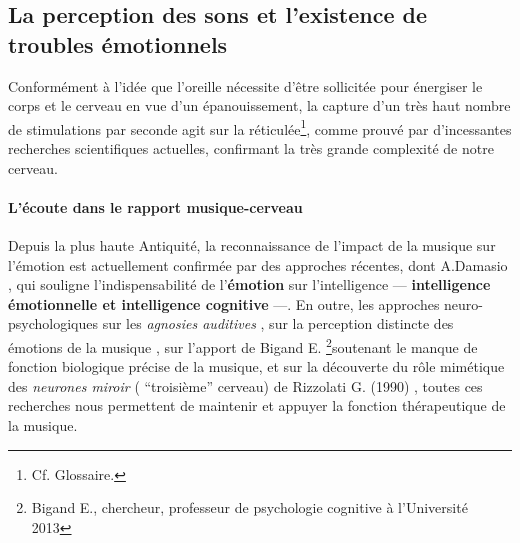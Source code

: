 \subsection{La perception des sons et l'existence de troubles
  émotionnels}


Conformément à l'idée que l'oreille nécessite d'être sollicitée pour
énergiser le corps et le cerveau en vue d'un épanouissement, la
capture d'un très haut nombre de stimulations par seconde agit
sur la \gls{réticulée}\footnote {Cf. Glossaire.},
comme prouvé par d'incessantes recherches scientifiques actuelles,
confirmant la très grande complexité de notre cerveau.








\paragraph{ L'écoute dans le rapport
  musique-cerveau}

Depuis la plus haute Antiquité,  la reconnaissance de
l'impact de la musique sur l'émotion est actuellement confirmée par
des approches récentes, dont A.Damasio  \autocite {damasio:lautre},
qui souligne l'indispensabilité de l'\textbf{émotion}
sur l'intelligence   ---     \textbf{intelligence émotionnelle et intelligence
  cognitive} ---.
En outre, les approches neuro-psychologiques sur les \textit{agnosies
  auditives} \autocite[ pp. 205--216]{seron.baron.ea:neuropsychologie},
sur la perception distincte des émotions de la musique
\autocite[pp. 223--224]{platel_neuropsychology_2002},
sur l'apport de Bigand E. \autocite[Ch. 3
p. 35, "Vous avez l'oreille musicale"]{bigand:cerveau} \footnote {Bigand E., chercheur, professeur
de psychologie cognitive à l'Université 2013 }soutenant le
manque de fonction biologique précise de la musique,
et sur la
découverte du rôle mimétique des\textit{ neurones miroir }( ``troisième''
cerveau) de Rizzolati G. (1990)
\autocite[118--119]{van_eersel_cerveau},
toutes ces recherches nous permettent de maintenir et
appuyer
la fonction thérapeutique de la musique.











